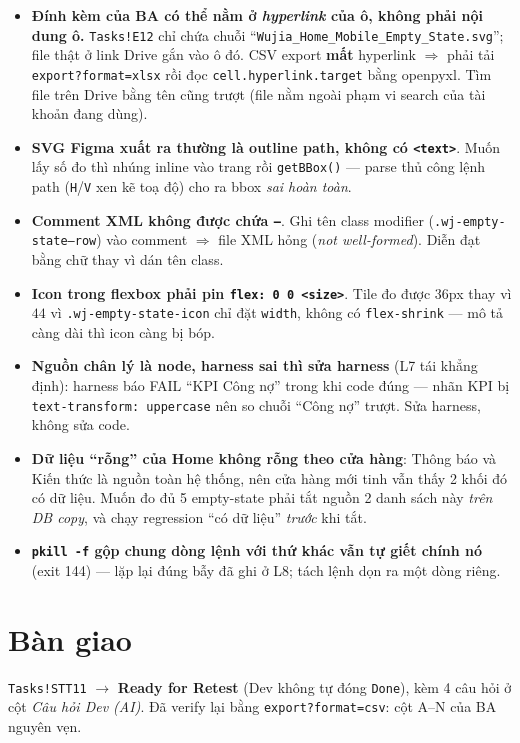 \begin{itemize}
  \item \textbf{Đính kèm của BA có thể nằm ở \emph{hyperlink} của ô, không phải nội dung ô.}
    \texttt{Tasks!E12} chỉ chứa chuỗi ``\texttt{Wujia\_Home\_Mobile\_Empty\_State.svg}''; file
    thật ở link Drive gắn vào ô đó. CSV export \textbf{mất} hyperlink $\Rightarrow$ phải tải
    \texttt{export?format=xlsx} rồi đọc \texttt{cell.hyperlink.target} bằng openpyxl. Tìm file
    trên Drive bằng tên cũng trượt (file nằm ngoài phạm vi search của tài khoản đang dùng).
  \item \textbf{SVG Figma xuất ra thường là outline path, không có \texttt{<text>}}. Muốn lấy số
    đo thì nhúng inline vào trang rồi \texttt{getBBox()} --- parse thủ công lệnh path
    (\texttt{H}/\texttt{V} xen kẽ toạ độ) cho ra bbox \emph{sai hoàn toàn}.
  \item \textbf{Comment XML không được chứa \texttt{--}}. Ghi tên class modifier
    (\texttt{.wj-empty-state--row}) vào comment $\Rightarrow$ file XML hỏng
    (\emph{not well-formed}). Diễn đạt bằng chữ thay vì dán tên class.
  \item \textbf{Icon trong flexbox phải pin \texttt{flex: 0 0 <size>}}. Tile đo được $36$px thay
    vì $44$ vì \texttt{.wj-empty-state-icon} chỉ đặt \texttt{width}, không có
    \texttt{flex-shrink} --- mô tả càng dài thì icon càng bị bóp.
  \item \textbf{Nguồn chân lý là node, harness sai thì sửa harness} (L7 tái khẳng định): harness
    báo FAIL ``KPI Công nợ'' trong khi code đúng --- nhãn KPI bị \texttt{text-transform:
    uppercase} nên so chuỗi ``Công nợ'' trượt. Sửa harness, không sửa code.
  \item \textbf{Dữ liệu ``rỗng'' của Home không rỗng theo cửa hàng}: Thông báo và Kiến thức là
    nguồn toàn hệ thống, nên cửa hàng mới tinh vẫn thấy 2 khối đó có dữ liệu. Muốn đo đủ 5
    empty-state phải tắt nguồn 2 danh sách này \emph{trên DB copy}, và chạy regression
    ``có dữ liệu'' \emph{trước} khi tắt.
  \item \textbf{\texttt{pkill -f} gộp chung dòng lệnh với thứ khác vẫn tự giết chính nó} (exit
    144) --- lặp lại đúng bẫy đã ghi ở L8; tách lệnh dọn ra một dòng riêng.
\end{itemize}

\section{Bàn giao}

\texttt{Tasks!STT11} $\rightarrow$ \textbf{Ready for Retest} (Dev không tự đóng \texttt{Done}),
kèm 4 câu hỏi ở cột \emph{Câu hỏi Dev (AI)}. Đã verify lại bằng \texttt{export?format=csv}: cột
A--N của BA nguyên vẹn.

